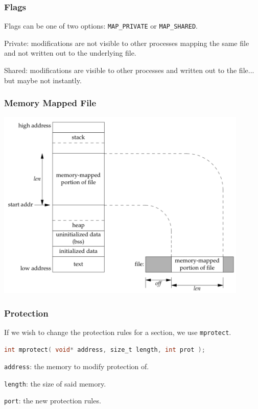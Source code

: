 \begin{frame}
\frametitle{Flags}
Flags can be one of two options: \texttt{MAP\_PRIVATE} or \texttt{MAP\_SHARED}.

Private: modifications are not visible to other processes mapping the same file and not written out to the underlying file.

Shared: modifications are visible to other processes and written out to the file... but maybe not instantly.

\end{frame}


\begin{frame}
\frametitle{Memory Mapped File}

\begin{center}
\includegraphics[width=0.9\textwidth]{images/memory-mapped-file.png}
\end{center}

\end{frame}


\begin{frame}[fragile]
\frametitle{Protection}

If we wish to change the protection rules for a section, we use \texttt{mprotect}.

\begin{lstlisting}[language=C]
int mprotect( void* address, size_t length, int prot );
\end{lstlisting}

\texttt{address}: the memory to modify protection of.

\texttt{length}: the size of said memory.

\texttt{port}: the new protection rules.

\end{frame}


